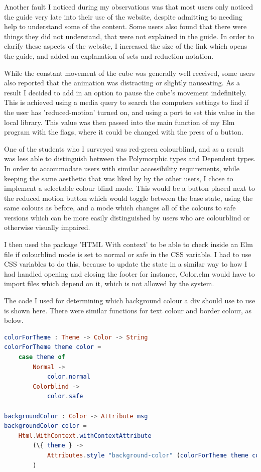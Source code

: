 \documentclass{l4proj}
\begin{document}
Another fault I noticed during my observations was that most users only noticed the guide very late into their use of the website, despite admitting to needing help to understand some of the content.  Some users also found that there were things they did not understand, that were not explained in the guide.  In order to clarify these aspects of the website, I increased the size of the link which opens the guide, and added an explanation of sets and reduction notation.

While the constant movement of the cube was generally well received, some users also reported that the animation was distracting or slightly nauseating.  As a result I decided to add in an option to pause the cube's movement indefinitely.  This is achieved using a media query to search the computers settings to find if the user has 'reduced-motion' turned on, and using a port to set this value in the local library.  This value was then passed into the main function of my Elm program with the flags, where it could be changed with the press of a button.

One of the students who I surveyed was red-green colourblind, and as a result was less able to distinguish between the Polymorphic types and Dependent types.  In order to accommodate users with similar accessibility requirements, while keeping the same aesthetic that was liked by by the other users, I chose to implement a selectable colour blind mode.  This would be a button placed next to the reduced motion button which would toggle between the base state, using the same colours as before, and a mode which changes all of the colours to safe versions which can be more easily distinguished by users who are colourblind or otherwise visually impaired.

I then used the package 'HTML With context' to be able to check inside an Elm file if colourblind mode is set to normal or safe in the CSS variable.  I had to use CSS variables to do this, because to update the state in a similar way to how I had handled opening and closing the footer for instance, Color.elm would have to import files which depend on it, which is not allowed by the system.

The code I used for determining which background colour a div should use to use is shown here.  There were similar functions for text colour and border colour, as below.

\begin{lstlisting}[language = Elm]
colorForTheme : Theme -> Color -> String
colorForTheme theme color =
    case theme of
        Normal ->
            color.normal
        Colorblind ->
            color.safe

backgroundColor : Color -> Attribute msg
backgroundColor color =
    Html.WithContext.withContextAttribute
        (\{ theme } ->
            Attributes.style "background-color" (colorForTheme theme color)
        )
\end{lstlisting}
\end{document}
